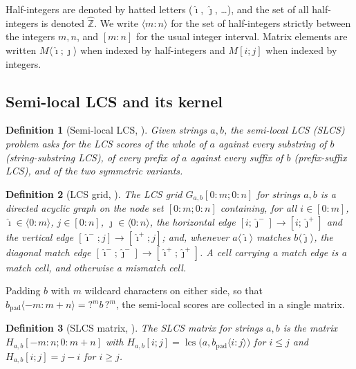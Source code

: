 \documentclass[10pt]{article}
\newtheorem{definition}{Definition}
\newcommand{\lcs}{\operatorname{lcs}}
\newcommand{\Zh}{\widehat{\mathbb{Z}}}
\begin{document}
Half-integers are denoted by hatted letters ($\hat\imath$, $\hat\jmath$,
\ldots), and the set of all half-integers is denoted $\Zh$. We write
$\langle m:n\rangle$ for the set of half-integers strictly between the
integers $m,n$, and $[m:n]$ for the usual integer interval. Matrix elements
are written $M\langle\hat\imath;\hat\jmath\rangle$ when indexed by
half-integers and $M[i;j]$ when indexed by integers.

\subsection{Semi-local LCS and its kernel}

\begin{definition}[Semi-local LCS, {\cite[Definition 3]{GZT25}}]
Given strings $a,b$, the \emph{semi-local LCS} (SLCS) problem asks for the LCS
scores of the whole of $a$ against every substring of $b$ (string-substring
LCS), of every prefix of $a$ against every suffix of $b$ (prefix-suffix LCS),
and of the two symmetric variants.
\end{definition}

\begin{definition}[LCS grid, {\cite[Definition 4]{GZT25}}]\label{def:grid}
The \emph{LCS grid} $G_{a,b}[0:m;0:n]$ for strings $a,b$ is a directed acyclic
graph on the node set $[0:m;0:n]$ containing, for all $i\in[0:m]$,
$\hat\imath\in\langle 0:m\rangle$, $j\in[0:n]$,
$\hat\jmath\in\langle 0:n\rangle$, the horizontal edge
$[i;\hat\jmath^-]\to[i;\hat\jmath^+]$ and the vertical edge
$[\hat\imath^-;j]\to[\hat\imath^+;j]$; and, whenever
$a\langle\hat\imath\rangle$ matches $b\langle\hat\jmath\rangle$, the diagonal
\emph{match edge} $[\hat\imath^-;\hat\jmath^-]\to[\hat\imath^+;\hat\jmath^+]$.
A cell carrying a match edge is a \emph{match cell}, and otherwise a
\emph{mismatch cell}.
\end{definition}

Padding $b$ with $m$ wildcard characters on either side, so that
$b_{\mathrm{pad}}\langle-m:m+n\rangle=\text{?}^m b\,\text{?}^m$, the
semi-local scores are collected in a single matrix.

\begin{definition}[SLCS matrix, {\cite[Definition 5]{GZT25}}]
The \emph{SLCS matrix} for strings $a,b$ is the matrix
$H_{a,b}[-m:n;0:m+n]$ with $H_{a,b}[i;j]=
\lcs\bigl(a,b_{\mathrm{pad}}\langle i:j\rangle\bigr)$ for $i\le j$ and
$H_{a,b}[i;j]=j-i$ for $i\ge j$.
\end{definition}
\end{document}
